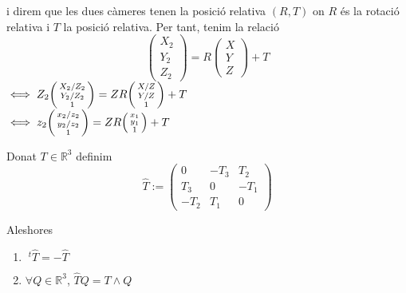 \documentclass[a4paper,12pt]{article}
\begin{document}
	i direm que les dues càmeres tenen la posició relativa $(R,T)$ on $R$ és la rotació relativa i $T$ la posició relativa.
	Per tant, tenim la relació
	\begin{displaymath}
		\begin{pmatrix}
			X_2\\Y_2\\Z_2
		\end{pmatrix} =
		R \begin{pmatrix}
			X\\Y\\Z
			\end{pmatrix}
		+ T
	\end{displaymath}
	$\iff Z_2\begin{psmallmatrix}X_2/Z_2\\Y_2/Z_2\\1\end{psmallmatrix} = ZR\begin{psmallmatrix}X/Z\\Y/Z\\1\end{psmallmatrix} + T$\\
	$\iff z_2\begin{psmallmatrix}x_2/z_2\\y_2/z_2\\1\end{psmallmatrix} = ZR\begin{psmallmatrix}x_1\\y_1\\1\end{psmallmatrix} + T$\\
	\begin{definicio}
		Donat $T \in \mathbb{R}^3$ definim
		\begin{displaymath}
			\hat{T} := \begin{pmatrix}
				0 & -T_3 & T_2\\
				T_3 & 0 & -T_1\\
				-T_2 & T_1 & 0
				\end{pmatrix}
		\end{displaymath}
	\end{definicio}
	Aleshores
	\begin{proposicio}
		\begin{enumerate}
			\item $\;^t\hat{T} = - \hat{T}$
			\item $\forall Q \in \mathbb{R}^3$, $\hat{T}Q = T \wedge Q$
		\end{enumerate}
	\end{proposicio}
\end{document}
